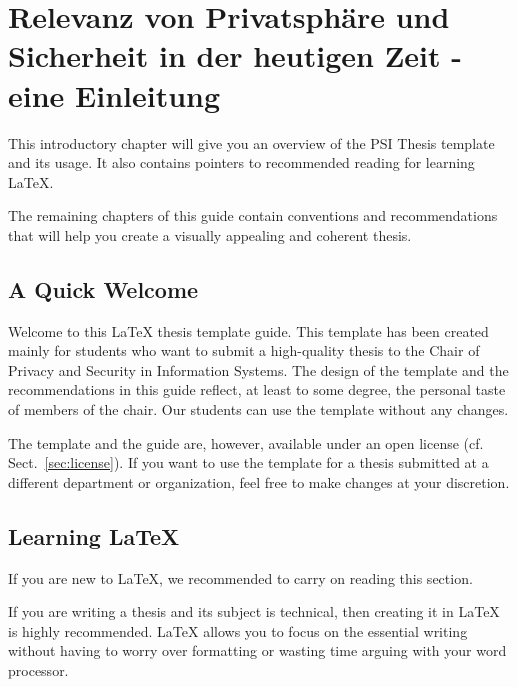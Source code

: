 \chapter{Relevanz von Privatsphäre und Sicherheit in der heutigen Zeit - eine Einleitung} %

\label{Chapter1} %


This introductory chapter will give you an overview of the PSI Thesis template and its usage.
It also contains pointers to recommended reading for learning \LaTeX{}.

The remaining chapters of this guide contain conventions and recommendations that will help you create a visually appealing and coherent thesis.

\section{A Quick Welcome}

Welcome to this LaTeX thesis template guide.%
This template has been created mainly for students who want to submit a high-quality thesis to the Chair of Privacy and Security in Information Systems. The design of the template and the recommendations in this guide reflect, at least to some degree, the personal taste of members of the chair. Our students can use the template without any changes.

The template and the guide are, however, available under an open license (cf. Sect.~\ref{sec:license}). If you want to use the template for a thesis submitted at a different department or organization, feel free to make changes at your discretion.


\section{Learning LaTeX}

If you are new to LaTeX, we recommended to carry on reading this section.

If you are writing a thesis and its subject is technical, then creating it in LaTeX is highly recommended. LaTeX allows you to focus on the essential writing without having to worry over formatting or wasting time arguing with your word processor.

